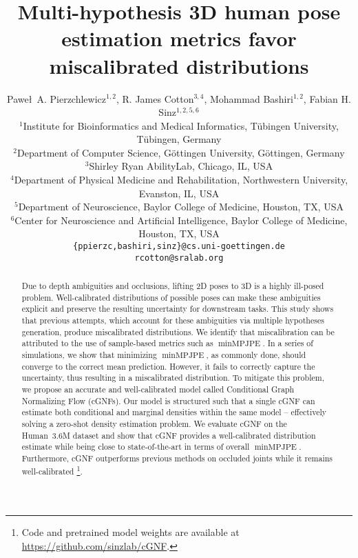 \documentclass{article} \usepackage{iclr2023_conference,times}
\title{Multi-hypothesis 3D human pose estimation metrics favor miscalibrated distributions}
\author{Pawe\l\ A. Pierzchlewicz$^{1,2}$, R. James Cotton$^{3,4}$, Mohammad Bashiri$^{1,2}$, Fabian H. Sinz$^{1,2,5,6}$\\
$^1$Institute for Bioinformatics and Medical Informatics, Tübingen University, Tübingen, Germany\\
$^2$Department of Computer Science, Göttingen University, Göttingen, Germany\\
$^3$Shirley Ryan AbilityLab, Chicago, IL, USA\\
$^4$Department of Physical Medicine and Rehabilitation, Northwestern University, Evanston, IL, USA \\
$^5$Department of Neuroscience, Baylor College of Medicine, Houston, TX, USA\\
$^6$Center for Neuroscience and Artificial Intelligence, Baylor College of Medicine, Houston, TX, USA\\
\texttt{\{ppierzc,bashiri,sinz\}@cs.uni-goettingen.de}\\\texttt{rcotton@sralab.org}
}
\begin{document}
\maketitle

\begin{abstract}
Due to depth ambiguities and occlusions, lifting 2D poses to 3D is a highly ill-posed problem.
Well-calibrated distributions of possible poses can make these ambiguities explicit and preserve the resulting uncertainty for downstream tasks. 
This study shows that previous attempts, which account for these ambiguities via multiple hypotheses generation, produce miscalibrated distributions.
We identify that miscalibration can be attributed to the use of sample-based metrics such as $\operatorname{minMPJPE}$.
In a series of simulations, we show that minimizing $\operatorname{minMPJPE}$, as commonly done, should converge to the correct mean prediction.
However, it fails to correctly capture the uncertainty, thus resulting in a miscalibrated distribution.
To mitigate this problem, we propose an accurate and well-calibrated model called Conditional Graph Normalizing Flow (cGNFs).
Our model is structured such that a single cGNF can estimate both conditional and marginal densities within the same model -- effectively solving a zero-shot density estimation problem.
We evaluate cGNF on the Human~3.6M dataset and show that cGNF provides a well-calibrated distribution estimate while being close to state-of-the-art in terms of overall $\operatorname{minMPJPE}$.
Furthermore, cGNF outperforms previous methods on occluded joints while it remains well-calibrated \footnote{Code and pretrained model weights are available at \url{https://github.com/sinzlab/cGNF}.}.
\end{abstract}
\end{document}

